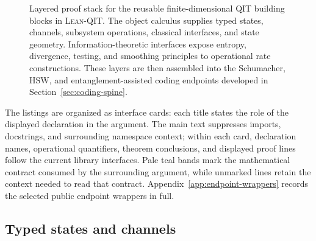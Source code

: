\documentclass[10pt,a4paper]{article}
\DeclareRobustCommand{\LeanQIT}{\textnormal{\textsc{Lean-QIT}}}
\begin{document}
\begin{figure}[ht]
\begin{tikzpicture}
\end{tikzpicture}
    \caption{Layered proof stack for the reusable finite-dimensional QIT
        building blocks in \LeanQIT{}.  The object calculus supplies typed states,
        channels, subsystem operations, classical interfaces, and state geometry.
        Information-theoretic interfaces expose entropy, divergence, testing, and
        smoothing principles to operational rate constructions.  These layers are
        then assembled into the Schumacher, HSW, and entanglement-assisted coding
        endpoints developed in Section~\ref{sec:coding-spine}.}
    \label{fig:qst-proof-flow}
\end{figure}


The listings are organized as interface cards: each title states the role of
the displayed declaration in the argument.  The main text suppresses imports,
docstrings, and surrounding namespace context; within each card, declaration
names, operational quantifiers, theorem conclusions, and displayed proof lines
follow the current library interfaces.  Pale teal bands mark the mathematical
contract consumed by the surrounding argument, while unmarked lines retain the
context needed to read that contract.  Appendix~\ref{app:endpoint-wrappers}
records the selected public endpoint wrappers in full.

\subsection{Typed states and channels}
\label{subsec:typed-states-channels}
\end{document}
